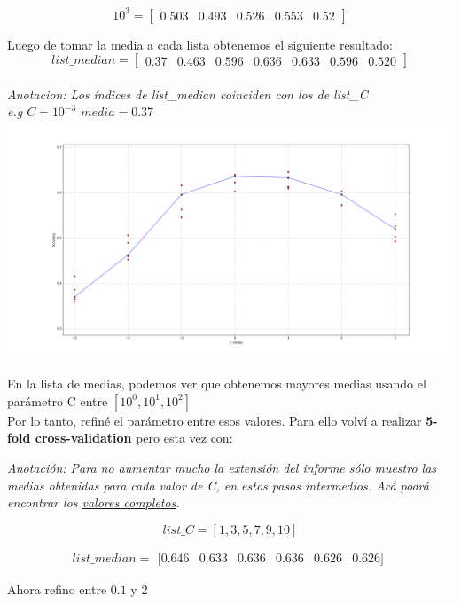 \documentclass[11pt, spanish, a4paper]{article}
\begin{document}
\[
10^{3}=
  \begin{bmatrix}
	0.503 & 0.493 & 0.526 & 0.553 & 0.52
  \end{bmatrix}
\]



Luego de tomar la media a cada lista obtenemos el siguiente resultado:
$$list\_median = \begin{bmatrix} 0.37 & 0.463 & 0.596 & 0.636 & 0.633 & 0.596 & 0.520 \end{bmatrix}$$
\\
\textit{Anotacion: Los índices de list\_median coinciden con los de list\_C \\
e.g $C=10^{-3}$  $media = 0.37 $} \\


\includegraphics[scale=0.5, width=\textwidth]{figure_1.png}


En la lista de medias, podemos ver que obtenemos mayores medias usando el parámetro C entre $[10^0, 10^1, 10^2]$\\

Por lo tanto, refiné el parámetro entre esos valores.
Para ello volví a realizar \textbf{5-fold cross-validation} pero esta vez con:

\textit{Anotación: Para no aumentar mucho la extensión del informe sólo muestro las medias obtenidas para cada valor de C, en estos pasos intermedios. Acá podrá encontrar los \href{https://docs.google.com/document/d/1D158FDx7AdrAAm8I0YpSBx6bWm-kD-P2EK3xNqMiJ7M/edit}{valores completos}.}

$$list\_C = [1, 3, 5, 7, 9, 10]$$

$$list\_median = \begin{matrix} [0.646 & 0.633 & 0.636 & 0.636 & 0.626 & 0.626] \end{matrix}$$

Ahora refino entre $0.1$ y $2$
\end{document}
